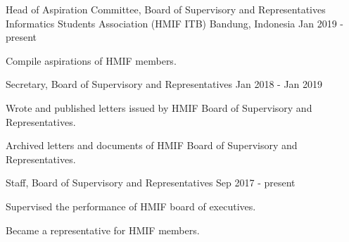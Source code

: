 

\begin{cventries}
    \cventry
        {Head of Aspiration Committee, Board of Supervisory and Representatives} %
        {Informatics Students Association (HMIF ITB)} %
        {Bandung, Indonesia} %
        {Jan 2019 - present} %
        {
            \begin{cvitems} %
                \item {Compile aspirations of HMIF members.}
            \end{cvitems}
        }
    
    \cventry
        {Secretary, Board of Supervisory and Representatives} %
        {} %
        {} %
        {Jan 2018 - Jan 2019} %
        {
            \begin{cvitems} %
                \item {Wrote and published letters issued by HMIF Board of Supervisory and Representatives.}
                \item {Archived letters and documents of HMIF Board of Supervisory and Representatives.}
            \end{cvitems}
        }
    
    \cventry
        {Staff, Board of Supervisory and Representatives} %
        {} %
        {} %
        {Sep 2017 - present} %
        {
            \begin{cvitems} %
                \item {Supervised the performance of HMIF board of executives.}
                \item {Became a representative for HMIF members.}
            \end{cvitems}
        }
\end{cventries}
